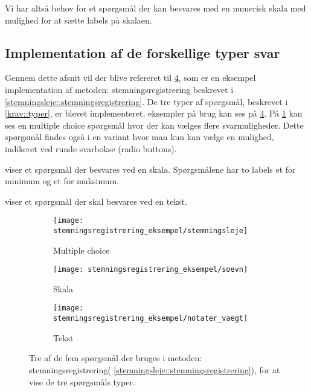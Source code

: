 Vi har altså behov for et spørgsmål der kan besvares med en numerisk skala med mulighed for at sætte labels på skalaen.

\subsection{Implementation af de forskellige typer svar}
Gennem dette afsnit vil der blive refereret til \cref{stemreg::spoergsmaal}, som er en eksempel implementation af metoden: stemningsregistrering beskrevet i \cref{stemningsleje::stemningsregistrering}.
De tre typer af spørgsmål, beskrevet i \cref{krav::typer}, er blevet implementeret, eksempler på brug kan ses på \cref{stemreg::spoergsmaal}.
På \cref{stemreg::stemningsleje} kan ses en multiple choice spørgsmål hvor der kan vælges flere svarmuligheder.
Dette spørgsmål findes også i en variant hvor man kun kan vælge en mulighed, indikeret ved runde svarbokse (radio buttons).

 viser et spørgsmål der besvares ved en skala. 
Spørgsmålene har to labels et for minimum og et for maksimum.

 viser et spørgsmål der skal besvares ved en tekst. 


\begin{figure}
	\centering
	\begin{subfigure}[b]{0.45\textwidth}
		\texttt{[image: stemningsregistrering\_eksempel/stemningsleje]}
		\caption{Multiple choice}\label{stemreg::stemningsleje}
	\end{subfigure}
	\hfill
\begin{minipage}[b]{0.45\textwidth}
	\begin{subfigure}[b]{\textwidth}
		\texttt{[image: stemningsregistrering\_eksempel/soevn]}
		\caption{Skala}\label{stemreg::soevn}
	\end{subfigure}
	\newline 
	\begin{subfigure}[b]{\textwidth}
		\texttt{[image: stemningsregistrering\_eksempel/notater\_vaegt]}
		\caption{Tekst}\label{stemreg::notater_vaegt}
	\end{subfigure}	
\end{minipage}	
	\caption{Tre af de fem spørgsmål der bruges i metoden: stemningsregistrering( \cref{stemningsleje::stemningsregistrering}), for at vise de tre spørgsmåls typer.}\label{stemreg::spoergsmaal}
\end{figure}

